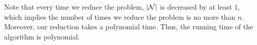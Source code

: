 
Note that every time we reduce the problem, $|\mathcal{N}|$ is decreased by at least $1$, which implies the number of times we reduce the problem is no more than $n$. Moreover, our reduction takes a polynomial time. Thus, the running time of the algorithm is polynomial. %